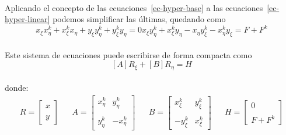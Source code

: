 \documentclass[letterpaper, openright, 12pt]{book}
\begin{document}
    \paragraph*{}
    Aplicando el concepto de las ecuaciones~\ref{ec-hyper-base} a las
    ecuaciones~\ref{ec-hyper-linear} podemos simplificar las últimas,
    quedando como
    \begin{subequations}
        \begin{equation}
            x_{\xi} x_{\eta}^{k} + x_{\xi}^{k} x_{\eta} + y_{\xi} y_{\eta}^{k}
            + y_{\xi}^{k} y_{\eta} = 0
        \end{equation}
        \begin{equation}
            x_{\xi} y_{\eta}^{k} + x_{\xi}^{k} y_{\eta} - x_{\eta} y_{\xi}^{k}
            - x_{\eta}^{k} y_{\xi} = F + F^{k}
        \end{equation}
        \label{ec-hyper-reducida}
    \end{subequations}

    \paragraph*{}
    Este sistema de ecuaciones puede escribirse de forma compacta como
    \begin{equation}
        \left[A \right] R_{\xi} + \left[ B \right] R_{\eta} = H
        \label{ec-hyper-compacta}
    \end{equation}\\ 
    donde:
    \begin{align*}
        R = \begin{bmatrix}
        x \\ \\
        y
        \end{bmatrix}&&
        A = \begin{bmatrix}
        x_{\eta}^{k} & y_{\eta}^{k} \\ \\
        y_{\eta}^{k} & -x_{\eta}^{k}
        \end{bmatrix}&&
        B = \begin{bmatrix}
        x_{\xi}^{k} & y_{\xi}^{k} \\ \\
        -y_{\xi}^{k} & x_{\xi}^{k}
        \end{bmatrix}&&
        H = \begin{bmatrix}
        0 \\ \\
        F + F^{k}
        \end{bmatrix}
    \end{align*}
\end{document}
